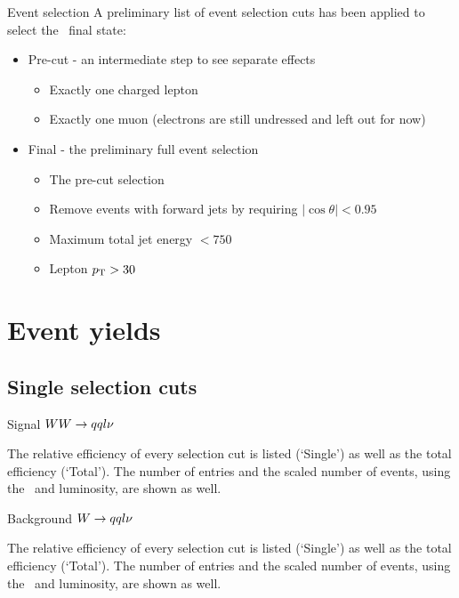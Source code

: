 \documentclass{beamer}
\newcommand{\texpath}{../analysis/tex/tex_ex}
\begin{document}
\begin{frame}{Event selection}
A preliminary list of event selection cuts has been applied to select the \qqln\ final state:
\begin{itemize}
%
\item Pre-cut - an intermediate step to see separate effects
\begin{itemize}
\item Exactly one charged lepton
\item Exactly one muon (electrons are still undressed and left out for now)
\end{itemize}
%
\item Final - the preliminary full event selection
\begin{itemize}
\item The pre-cut selection
\item Remove events with forward jets by requiring $|\cos \theta| < 0.95$
\item Maximum total jet energy $< 750$~\GeV
\item Lepton $p_\mathrm{T} > 30$~\GeV
\end{itemize}
%
\end{itemize}
\end{frame}









\section{Event yields}

\subsection{Single selection cuts}

\begin{frame}{Signal $WW\rightarrow qql\nu$}

The relative efficiency of every selection cut is listed (`Single') as well as the total efficiency (`Total').
%
The number of entries and the scaled number of events, using the \xsec\ and luminosity, are shown as well.
\end{frame}

\begin{frame}{Background $W\rightarrow qql\nu$}

The relative efficiency of every selection cut is listed (`Single') as well as the total efficiency (`Total').
%
The number of entries and the scaled number of events, using the \xsec\ and luminosity, are shown as well.
\end{frame}
\end{document}
